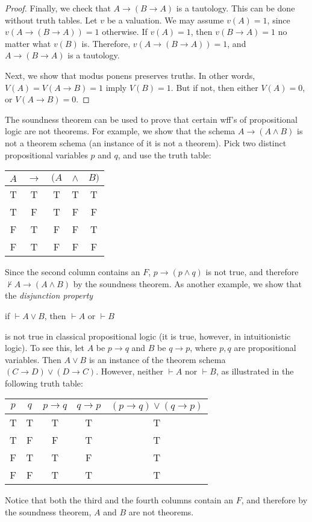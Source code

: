 \documentclass[12pt]{article}
\begin{document}
\begin{proof}
Finally, we check that $A\to (B\to A)$ is a tautology.  This can be done without truth tables.  Let $v$ be a valuation.  We may assume $v(A)=1$, since $v(A\to (B\to A))=1$ otherwise.  If $v(A)=1$, then $v(B\to A)=1$ no matter what $v(B)$ is.  Therefore, $v(A\to (B\to A))=1$, and $A\to (B\to A)$ is a tautology.

Next, we show that modus ponens preserves truths.  In other words, $V(A)=V(A\to B)=1$ imply $V(B)=1$.  But if not, then either $V(A)=0$, or $V(A\to B)=0$.
\end{proof}
The soundness theorem can be used to prove that certain wff's of propositional logic are not theorems.  For example, we show that the schema $A\to (A\land B)$ is not a theorem schema (an instance of it is not a theorem).  Pick two distinct propositional variables $p$ and $q$, and use the truth table:

\begin{center}
\begin{tabular}{ccccc}
$A$ & $\to$ & $(A$ & $\land$ & $B)$\\
\hline 
T & T & T & T & T\\
T & F & T & F & F\\
F & T & F & F & T\\
F & T & F & F & F
\end{tabular}
\end{center}
Since the second column contains an $F$, $p\to (p\land  q)$ is not true, and therefore $\not \vdash A\to (A\land B)$ by the soundness theorem.  As another example, we show that the \emph{disjunction property}
\begin{center} if $\vdash A \lor B$, then $\vdash A$ or $\vdash B$ \end{center}
is not true in classical propositional logic (it is true, however, in intuitionistic logic).  To see this, let $A$ be $p\to q$ and $B$ be $q\to p$, where $p,q$ are propositional variables.  Then $A\lor B$ is an instance of the theorem schema $(C\to D)\lor (D\to C)$.  However, neither $\vdash A$ nor $\vdash B$, as illustrated in the following truth table:
\begin{center}
\begin{tabular}{ccccc}
$p$ & $q$ & $p\to q$ & $q\to p$ & $(p\to q)\lor (q\to p)$ \\
\hline 
T & T & T & T & T\\
T & F & F & T & T\\
F & T & T & F & T\\
F & F & T & T & T
\end{tabular}
\end{center}
Notice that both the third and the fourth columns contain an $F$, and therefore by the soundness theorem, $A$ and $B$ are not theorems.

\end{document}
